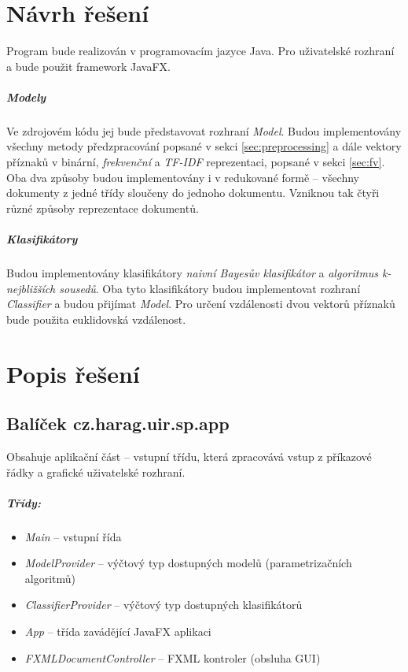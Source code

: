 \documentclass[12pt, a4paper]{report}
\begin{document}
\chapter{Návrh řešení}
Program bude realizován v programovacím jazyce Java. Pro uživatelské rozhraní a bude použit framework JavaFX.

\paragraph{Modely} Ve zdrojovém kódu jej bude představovat rozhraní \emph{Model}. Budou implementovány všechny metody předzpracování popsané v sekci \ref{sec:preprocessing} a dále vektory příznaků v binární, \emph{frekvenční} a \emph{TF-IDF} reprezentaci, popsané v sekci \ref{sec:fv}. Oba dva způsoby budou implementovány i v redukované formě -- všechny dokumenty z jedné třídy sloučeny do jednoho dokumentu. Vzniknou tak čtyři různé způsoby reprezentace dokumentů.

\paragraph{Klasifikátory} Budou implementovány klasifikátory \emph{naivní Bayesův klasifikátor} a \emph{algoritmus k-nejbližších sousedů}. Oba tyto klasifikátory budou implementovat rozhraní \emph{Classifier} a budou přijímat \emph{Model}. Pro určení vzdálenosti dvou vektorů příznaků bude použita euklidovská vzdálenost.


\chapter{Popis řešení}

\section{Balíček cz.harag.uir.sp.app}
Obsahuje aplikační část -- vstupní třídu, která zpracovává vstup z příkazové řádky a grafické uživatelské rozhraní.

\paragraph{Třídy:}
\begin{itemize}
	\item \emph{Main} -- vstupní řída
	\item \emph{ModelProvider} -- výčtový typ dostupných modelů (parametrizačních algoritmů)
	\item \emph{ClassifierProvider} -- výčtový typ dostupných klasifikátorů
	\item \emph{App} -- třída zavádějící JavaFX aplikaci
	\item \emph{FXMLDocumentController} -- FXML kontroler (obsluha GUI)
\end{itemize}
\end{document}
